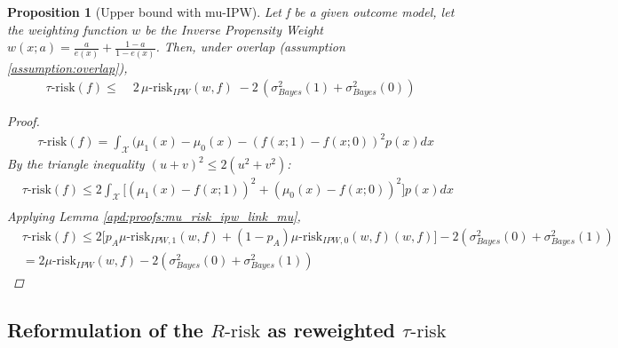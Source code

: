 \documentclass[10pt]{article}
\newtheorem{proposition*}{Proposition}
\newtheorem{proof}{Proof}
\begin{document}
\begin{proposition*}[Upper bound with mu-IPW]\label{apd:proofs:prop:upper_bound}
    Let f be a given outcome model, let the weighting function $w$ be the Inverse
    Propensity Weight $w(x; a) = \frac{a}{e(x)} + \frac{1-a}{1-e(x)}$. Then, under
    overlap (assumption \ref{assumption:overlap}),
    \begin{align*}
        \tau\text{-risk}(f) \leq & \; 2 \, \mu\text{-risk}_{IPW}(w, f)  \; - 2 \, (\sigma^2_{Bayes}(1) +  \sigma^2_{Bayes}(0))
    \end{align*}

    \begin{proof}
        \begin{align*}
             & \tau\text{-risk}(f) =\int_{\mathcal X}(\mu_{1}(x)-\mu_{0}(x)-(f(x ; 1)-f(x ; 0))^{2} p(x) d x
        \end{align*}
        By the triangle inequality $(u+v)^2 \leq 2(u^2 + v^2)$:
        \begin{align*}
             & \tau\text{-risk}(f) \leq
            2 \int_{\mathcal X}\big[\left(\mu_{1}(x)-f(x ; 1)\right)^{2}+\left(\mu_{0}(x)-f(x ; 0)\right)^{2}\big] p(x) d x \\
        \end{align*}
        Applying Lemma \ref{apd:proofs:mu_risk_ipw_link_mu},
        \begin{align*}
             & \tau\text{-risk}(f) \leq 2\big[p_A \mu\text{-risk}_{IPW, 1}(w, f) +(1-p_A) \mu\text{-risk}_{IPW, 0}(w, f)(w, f)\big] -2(\sigma^{2}_{Bayes}(0) + \sigma^{2}_{Bayes}(1)) \\
             & = 2 \mu\text{-risk}_{IPW}(w, f)-2(\sigma^{2}_{Bayes}(0) + \sigma^{2}_{Bayes}(1))
        \end{align*}
    \end{proof}
\end{proposition*}



\subsection{Reformulation of the $R\text{-risk}$ as reweighted
    $\tau\text{-risk}$}\label{apd:proofs:r_risk_rewrite}
\end{document}

